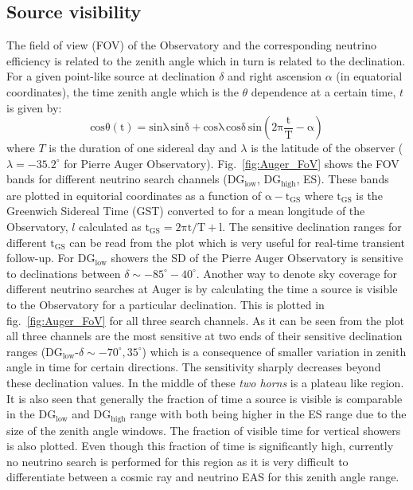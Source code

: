 \subsection{Source visibility}
\label{subsec:psource_coverage}
The field of view (FOV) of the Observatory and the corresponding neutrino efficiency is related to the zenith angle which in turn is related to the declination. For a given point-like source at declination $\delta$ and right ascension $\alpha$ (in equatorial coordinates), the time zenith angle which is the $\theta$ dependence at a certain time, $t$ is given by:
\begin{equation}
  \label{eq:zenith_angle_time}
  \mathrm{cos \theta(t) = sin \lambda \,sin \delta+ cos \lambda \, cos \delta \,sin (2\pi \frac{t}{T} - \alpha)}
\end{equation} 
where $T$ is the duration of one sidereal day and $\lambda$ is the latitude of the observer ($\lambda = -35.2^{\circ}$ for Pierre Auger Observatory). 
Fig.~\ref{fig:Auger_FoV} shows the FOV bands for different neutrino search channels (DG$\mathrm{_{low}}$, DG$\mathrm{_{high}}$, ES). These bands are plotted in equitorial coordinates as a function of $\mathrm{\alpha - t _{GS}}$ where $\mathrm{t_{GS}}$ is the Greenwich Sidereal Time (GST) converted to for a mean longitude of the Observatory, $l$ calculated as $\mathrm{t_{GS}= 2\pi t/T + l}$. The sensitive declination ranges for different $\mathrm{t_{GS}}$ can be read from the plot which is very useful for real-time transient follow-up. For DG$\mathrm{_{low}}$ showers the SD of the Pierre Auger Observatory is sensitive to declinations between $\delta \sim -85^{\circ} - 40^{\circ}$. Another way to denote sky coverage for different neutrino searches at Auger is by calculating the time a source is visible to the Observatory for a particular declination. This is plotted in fig.~\ref{fig:Auger_FoV} for all three search channels. As it can be seen from the plot all three channels are the most sensitive at two ends of their sensitive declination ranges (DG$\mathrm{_{low}}$-$\delta \sim -70^{\circ}, 35^{\circ}$) which is a consequence of smaller variation in zenith angle in time for certain directions. The sensitivity sharply decreases beyond these declination values. In the middle of these \textit{two horns} is a plateau like region. It is also seen that generally the fraction of time a source is visible is comparable in the DG$\mathrm{_{low}}$ and DG$\mathrm{_{high}}$ range with both being higher in the ES range due to the size of the zenith angle windows. The fraction of visible time for vertical showers is also plotted. Even though this fraction of time is significantly high, currently no neutrino search is performed for this region as it is very difficult to differentiate between a cosmic ray and neutrino EAS for this zenith angle range.

